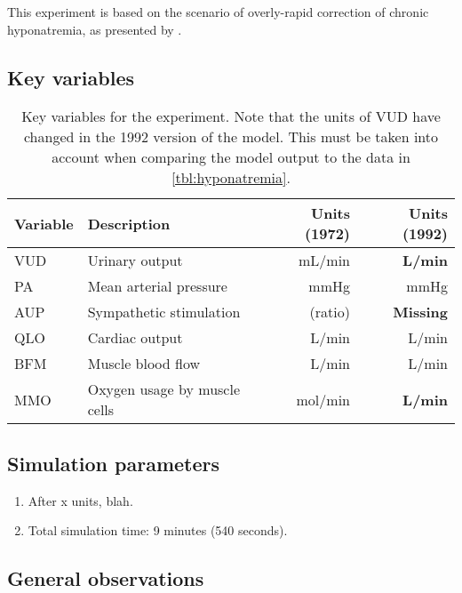 \label{exp:hyponatremia}

This experiment is based on the scenario of overly-rapid correction of chronic hyponatremia, as presented by \citeauthor{Kamel2010} \cite{Kamel2010}.

\subsection{Key variables}
\begin{table}[!h]
  \centering
  \begin{tabularx}{\textwidth}{lXrr}
    \toprule
    Variable & Description & Units (1972) & Units (1992) \\
    \midrule
    VUD & Urinary output & mL/min & \textbf{L/min} \\
    PA & Mean arterial pressure & mmHg & mmHg \\
    AUP & Sympathetic stimulation & (ratio) & \textbf{Missing} \\
    QLO & Cardiac output & L/min & L/min \\
    BFM & Muscle blood flow & L/min & L/min \\
    MMO & Oxygen usage by muscle cells & mol/min & \textbf{L/min} \\
    \bottomrule
  \end{tabularx}
  \caption{Key variables for the experiment. Note that the units of VUD have changed in the 1992 version of the model. This must be taken into account when comparing the model output to the data in \autoref{tbl:hyponatremia}.}
\end{table}

\subsection{Simulation parameters}
\begin{enumerate}
  \item After x units, blah.
  \item Total simulation time: 9 minutes (540 seconds).
\end{enumerate}

\subsection{General observations}
